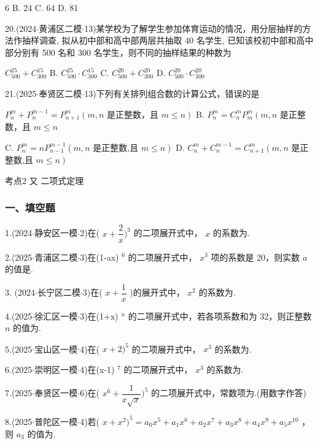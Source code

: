 \xx{}{}{}{}6 B. 24 C. 64 D. 81

20.(2024$\cdot$黄浦区二模$\cdot$13)某学校为了解学生参加体育运动的情况，用分层抽样的方法作抽样调查, 拟从初中部和高中部两层共抽取 40 名学生, 已知该校初中部和高中部分别有 500 名和 300 名学生，则不同的抽样结果的种数为 \dotfill{(\kh{})}

\xx{}{}{}{}${{C}}_{500}^{25} + {{C}}_{300}^{15}$ B. ${{C}}_{500}^{25} \cdot  {{C}}_{300}^{15}$ C. ${{C}}_{500}^{20} + {{C}}_{300}^{20}$ D. ${{C}}_{500}^{20} \cdot  {{C}}_{300}^{20}$

21.(2025$\cdot$奉贤区二模$\cdot$13)下列有关排列组合数的计算公式，错误的是 \dotfill{(\kh{})}

\xx{}{}{}{}${{P}}_{n}^{m} + {{P}}_{n}^{m - 1} = {{P}}_{n + 1}^{m}\left( {m,n}\right.$ 是正整数，且 $\left. {m \leq  n}\right)$ B. ${{P}}_{n}^{m} = {{C}}_{n}^{m}{{P}}_{m}^{m}\left( {m,n}\right.$ 是正整数，且 $m \leq  n$

C. ${{P}}_{n}^{m} = n{{P}}_{n - 1}^{m - 1}\left( {m,n\text{ 是正整数,且 }m \leq  n}\right)$ D. ${{C}}_{n}^{m} + {{C}}_{n}^{m - 1} = {{C}}_{n + 1}^{m}\left( {m,n}\right.$ 是正整数,且 $\left. {m \leq  n}\right)$

考点2 又 二项式定理

\subsubsection*{一、填空题}

1.(2024$\cdot$静安区一模$\cdot$2)在( $x + \dfrac{2}{x}{)}^{3}$ 的二项展开式中， $x$ 的系数为\blkda[2]{}.

2.(2025$\cdot$青浦区二模$\cdot$3)在(1-ax) $^{6}$ 的二项展开式中， ${x}^{3}$ 项的系数是 20，则实数 $a$ 的值是\blkda[2]{}.

3. (2024$\cdot$长宁区二模$\cdot$3)在( $x + \dfrac{1}{x}$ )的展开式中， ${x}^{2}$ 的系数为\blkda[2]{}.

4.(2025$\cdot$徐汇区一模$\cdot$3)在(1+x) $^{n}$ 的二项展开式中，若各项系数和为 32，则正整数 $n$ 的值为\blkda[2]{}.

5.(2025$\cdot$宝山区一模$\cdot$4)在( $x + 2{)}^{5}$ 的二项展开式中， ${x}^{3}$ 的系数为\blkda[2]{}.

6.(2025$\cdot$崇明区一模$\cdot$4)在(x-1) ${ }^{7}$ 的二项展开式中， ${x}^{3}$ 的系数为\blkda[2]{}.

7.(2025$\cdot$奉贤区一模$\cdot$6)在( ${x}^{6} + \dfrac{1}{x\sqrt{x}}{)}^{5}$ 的二项展开式中，常数项为\blkda[2]{}.(用数字作答)

8.(2025$\cdot$普陀区一模$\cdot$4)若( $x + {x}^{2}{)}^{5} = {a}_{0}{x}^{5} + {a}_{1}{x}^{6} + {a}_{2}{x}^{7} + {a}_{3}{x}^{8} + {a}_{4}{x}^{9} + {a}_{5}{x}^{10}$ ，则 ${a}_{3}$ 的值为\blkda[2]{}.

